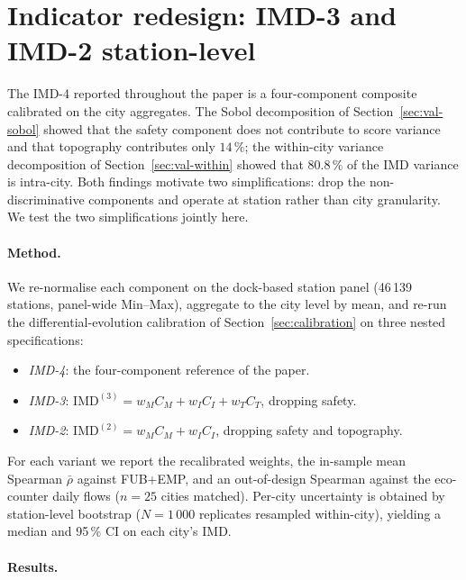 \documentclass[11pt,a4paper]{article}
\newcommand{\IMD}{\mathrm{IMD}}
\begin{document}
\section{Indicator redesign: IMD-3 and IMD-2 station-level}
\label{sec:imd-redesign}

The IMD-4 reported throughout the paper is a four-component
composite calibrated on the city aggregates. The Sobol
decomposition of Section~\ref{sec:val-sobol} showed that the
safety component does not contribute to score variance and that
topography contributes only $14\,\%$; the within-city variance
decomposition of Section~\ref{sec:val-within} showed that
$80.8\,\%$ of the IMD variance is intra-city. Both findings
motivate two simplifications: drop the non-discriminative
components and operate at station rather than city granularity.
We test the two simplifications jointly here.

\paragraph{Method.}
We re-normalise each component on the dock-based station panel
(46\,139 stations, panel-wide Min--Max), aggregate to the city
level by mean, and re-run the differential-evolution calibration
of Section~\ref{sec:calibration} on three nested specifications:
\begin{itemize}
\item \emph{IMD-4}: the four-component reference of the paper.
\item \emph{IMD-3}: $\IMD^{(3)} = w_M C_M + w_I C_I + w_T C_T$,
dropping safety.
\item \emph{IMD-2}: $\IMD^{(2)} = w_M C_M + w_I C_I$, dropping
safety and topography.
\end{itemize}
For each variant we report the recalibrated weights, the
in-sample mean Spearman $\bar\rho$ against FUB+EMP, and an
out-of-design Spearman against the eco-counter daily flows
($n = 25$ cities matched). Per-city uncertainty is obtained by
station-level bootstrap ($N = 1\,000$ replicates resampled
within-city), yielding a median and 95\,\% CI on each city's IMD.

\paragraph{Results.}
\end{document}
